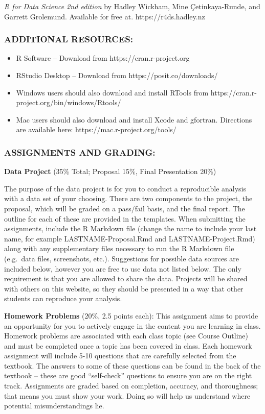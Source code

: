 \documentclass[
  letterpaper,
  DIV=11,
  numbers=noendperiod]{scrartcl}
\providecommand{\tightlist}{%
  \setlength{\itemsep}{0pt}\setlength{\parskip}{0pt}}\usepackage{longtable,booktabs,array}
\begin{document}
\emph{R for Data Science 2nd edition} by Hadley Wickham, Mine
Çetinkaya-Runde, and Garrett Grolemund. Available for free at.
https://r4ds.hadley.nz

\subsubsection{ADDITIONAL RESOURCES:}\label{additional-resources}

\begin{itemize}
\tightlist
\item
  R Software -- Download from https://cran.r-project.org
\item
  RStudio Desktop -- Download from https://posit.co/downloads/
\item
  Windows users should also download and install RTools from
  https://cran.r-project.org/bin/windows/Rtools/
\item
  Mac users should also download and install Xcode and gfortran.
  Directions are available here: https://mac.r-project.org/tools/
\end{itemize}

\subsubsection{ASSIGNMENTS AND GRADING:}\label{assignments-and-grading}

\textbf{Data Project} (35\% Total; Proposal 15\%, Final Presentation
20\%)

The purpose of the data project is for you to conduct a reproducible
analysis with a data set of your choosing. There are two components to
the project, the proposal, which will be graded on a pass/fail basis,
and the final report. The outline for each of these are provided in the
templates. When submitting the assignments, include the R Markdown file
(change the name to include your last name, for example
LASTNAME-Proposal.Rmd and LASTNAME-Project.Rmd) along with any
supplementary files necessary to run the R Markdown file (e.g.~data
files, screenshots, etc.). Suggestions for possible data sources are
included below, however you are free to use data not listed below. The
only requirement is that you are allowed to share the data. Projects
will be shared with others on this website, so they should be presented
in a way that other students can reproduce your analysis.

\textbf{Homework Problems} (20\%, 2.5 points each): This assignment aims
to provide an opportunity for you to actively engage in the content you
are learning in class. Homework problems are associated with each class
topic (see Course Outline) and must be completed once a topic has been
covered in class. Each homework assignment will include 5-10 questions
that are carefully selected from the textbook. The answers to some of
these questions can be found in the back of the textbook -- these are
good ``self-check'' questions to ensure you are on the right track.
Assignments are graded based on completion, accuracy, and thoroughness;
that means you must show your work. Doing so will help us understand
where potential misunderstandings lie.
\end{document}
